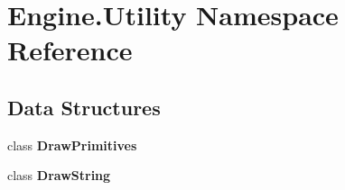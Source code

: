 \hypertarget{a00282}{}\section{Engine.\+Utility Namespace Reference}
\label{a00282}
\subsection*{Data Structures}
\begin{DoxyCompactItemize}
\item 
class {\bfseries Draw\+Primitives}
\item 
class {\bfseries Draw\+String}
\end{DoxyCompactItemize}
